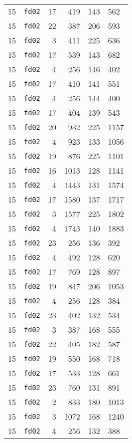 \documentclass{article}
\begin{document}
\begin{table}[h!]
\begin{tabular}{llrrrl}
    15 & \texttt{fd02} & 17 & 419 & 143 & 562 \\
    15 & \texttt{fd02} & 22 & 387 & 206 & 593 \\
    15 & \texttt{fd02} & 3 & 411 & 225 & 636 \\
    15 & \texttt{fd02} & 17 & 539 & 143 & 682 \\
    15 & \texttt{fd02} & 4 & 256 & 146 & 402 \\
    15 & \texttt{fd02} & 17 & 410 & 141 & 551 \\
    15 & \texttt{fd02} & 4 & 256 & 144 & 400 \\
    15 & \texttt{fd02} & 17 & 404 & 139 & 543 \\
    15 & \texttt{fd02} & 20 & 932 & 225 & 1157 \\
    15 & \texttt{fd02} & 4 & 923 & 133 & 1056 \\
    15 & \texttt{fd02} & 19 & 876 & 225 & 1101 \\
    15 & \texttt{fd02} & 16 & 1013 & 128 & 1141 \\
    15 & \texttt{fd02} & 4 & 1443 & 131 & 1574 \\
    15 & \texttt{fd02} & 17 & 1580 & 137 & 1717 \\
    15 & \texttt{fd02} & 3 & 1577 & 225 & 1802 \\
    15 & \texttt{fd02} & 4 & 1743 & 140 & 1883 \\
    15 & \texttt{fd02} & 23 & 256 & 136 & 392 \\
    15 & \texttt{fd02} & 4 & 492 & 128 & 620 \\
    15 & \texttt{fd02} & 17 & 769 & 128 & 897 \\
    15 & \texttt{fd02} & 19 & 847 & 206 & 1053 \\
    15 & \texttt{fd02} & 4 & 256 & 128 & 384 \\
    15 & \texttt{fd02} & 23 & 402 & 132 & 534 \\
    15 & \texttt{fd02} & 3 & 387 & 168 & 555 \\
    15 & \texttt{fd02} & 22 & 405 & 182 & 587 \\
    15 & \texttt{fd02} & 19 & 550 & 168 & 718 \\
    15 & \texttt{fd02} & 17 & 533 & 128 & 661 \\
    15 & \texttt{fd02} & 23 & 760 & 131 & 891 \\
    15 & \texttt{fd02} & 2 & 833 & 180 & 1013 \\
    15 & \texttt{fd02} & 3 & 1072 & 168 & 1240 \\
    15 & \texttt{fd02} & 4 & 256 & 132 & 388 \\

\end{tabular}
\end{table}
\end{document}
